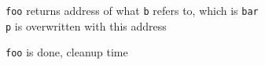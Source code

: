 \begin{frame}
\begin{overprint}
    \begin{center}
      {\tt foo} returns address of what {\tt b} refers to, which is {\tt bar} \\
      {\tt p} is overwritten with this address
    \end{center}

    \begin{center}
      {\tt foo} is done, cleanup time
    \end{center}

  \end{overprint}
\end{frame}



